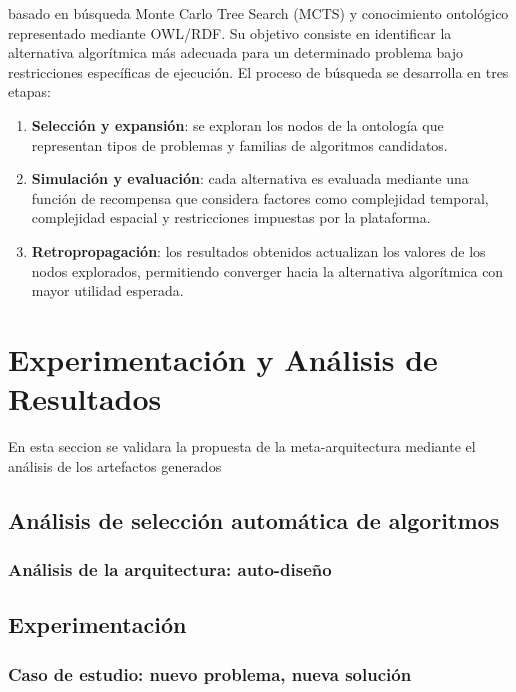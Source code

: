 \documentclass[12pt, letterpaper, oneside]{book}
\begin{document}
basado en búsqueda Monte Carlo Tree Search (MCTS) y conocimiento ontológico representado mediante OWL/RDF. Su objetivo consiste en identificar la alternativa algorítmica más adecuada para un determinado problema bajo restricciones específicas de ejecución. El proceso de búsqueda se desarrolla en tres etapas: \begin{enumerate} \item \textbf{Selección y expansión}: se exploran los nodos de la ontología que representan tipos de problemas y familias de algoritmos candidatos. \item \textbf{Simulación y evaluación}: cada alternativa es evaluada mediante una función de recompensa que considera factores como complejidad temporal, complejidad espacial y restricciones impuestas por la plataforma. \item \textbf{Retropropagación}: los resultados obtenidos actualizan los valores de los nodos explorados, permitiendo converger hacia la alternativa algorítmica con mayor utilidad esperada. \end{enumerate}

\chapter{Experimentación y Análisis de Resultados}\label{resultados}

En esta seccion se validara la propuesta de la meta-arquitectura mediante el análisis
de los artefactos generados

\section{Análisis de selección automática de algoritmos}



\subsection{Análisis de la arquitectura: auto-diseño}



\section{Experimentación}



\subsection{Caso de estudio: nuevo problema, nueva solución}
\end{document}
